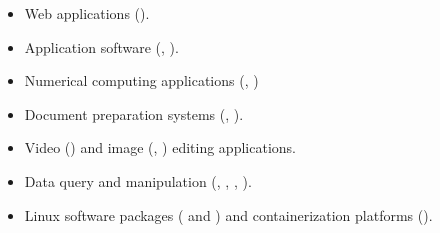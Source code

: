 \begin{cvskills}
{\hfill
\begin{minipage}{0.48\textwidth}
\vspace{0.3em}
\begin{itemize}[labelwidth=\the\widest,align=right,leftmargin=!,labelsep=1pt,noitemsep]
\item[\custItem] Web applications (\textsc{\color{awesome}{Angular}}).
\item[\custItem] Application software (\textsc{\color{awesome}{Microsoft Office}},
\textsc{\color{awesome}{Google Doc Suite}}).
\item[\custItem] Numerical computing applications
(\textsc{\color{awesome}{Matlab}}, \textsc{\color{awesome}{Mathematica}})
\item[\custItem] Document preparation systems ({\color{awesome}{\LaTeX}},
{\color{awesome}{\TeX}}).
\item[\custItem] Video (\textsc{\color{awesome}{Adobe Premiere}}) and
image (\textsc{\color{awesome}{Adobe Photoshop}},
\textsc{\color{awesome}{Gimp}}) editing applications.
\item[\custItem] Data query and manipulation (\textsc{\color{awesome}{sql}}, 
\textsc{\color{awesome}{json}}, \textsc{\color{awesome}{xml}},
\textsc{\color{awesome}{csv}}).
\item[\custItem] Linux software packages (\textsc{\color{awesome}{deb}} and
\textsc{\color{awesome}{rpm}}) and containerization platforms
(\textsc{\color{awesome}{docker}}).
\end{itemize}
\end{minipage}
}


\end{cvskills}

